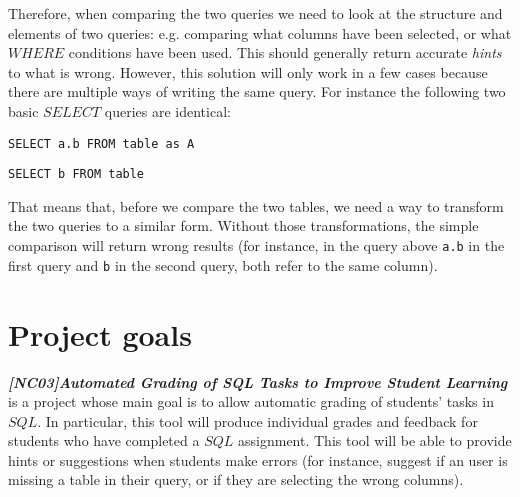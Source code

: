 Therefore, when comparing the two queries we need to look at the structure
and elements of two queries: e.g. comparing what columns have been selected, or
what $WHERE$ conditions have been used. This should generally return accurate
\textit{hints} to what is wrong. However, this solution will only work in a few
cases because there are multiple ways of writing the same query. For instance
the following two basic $SELECT$ queries are identical:
\begin{center}
    \texttt{SELECT a.b FROM table as A}

    \texttt{SELECT b FROM table}
\end{center}

That means that, before we compare the two tables, we need a way to transform
the two queries to a similar form. Without those transformations, the simple
comparison will return wrong results (for instance, in the query above
\texttt{a.b} in the first query and \texttt{b} in the second query, both refer
to the same column).


\section{Project goals}
\textbf{\textit{[NC03]Automated Grading of SQL Tasks to Improve Student Learning}}
is a project whose main goal is to allow automatic grading of students' tasks
in $SQL$. In particular, this tool will produce individual grades and feedback
for students who have completed a $SQL$ assignment. This tool will be able to
provide hints or suggestions when students make errors
(for instance, suggest if an user is missing a table in their query, or if they
are selecting the wrong columns).
